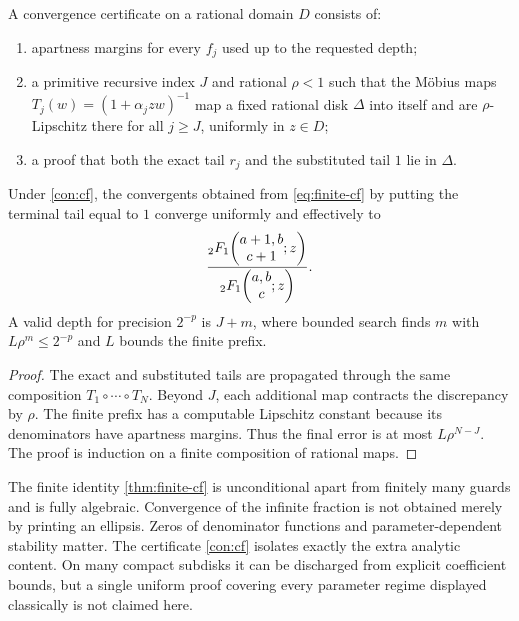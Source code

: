 \begin{contract}\label{con:cf}
A convergence certificate on a rational domain \(D\) consists of:
\begin{enumerate}
\item apartness margins for every \(f_j\) used up to the requested depth;
\item a primitive recursive index \(J\) and rational \(\rho<1\) such that the
Möbius maps \(T_j(w)=(1+\alpha_jzw)^{-1}\) map a fixed rational disk \(\Delta\)
into itself and are \(\rho\)-Lipschitz there for all \(j\ge J\), uniformly in
\(z\in D\);
\item a proof that both the exact tail \(r_j\) and the substituted tail \(1\)
lie in \(\Delta\).
\end{enumerate}
\end{contract}

\begin{theorem}\label{thm:gauss-cf}
Under \cref{con:cf}, the convergents obtained from
\eqref{eq:finite-cf} by putting the terminal tail equal to \(1\) converge
uniformly and effectively to
\[
 \frac{{}_2F_1\!\left(\begin{matrix}a+1,b\\c+1\end{matrix};z\right)}{{}_2F_1\!\left(\begin{matrix}a,b\\c\end{matrix};z\right)}.
\]
A valid depth for precision \(2^{-p}\) is
\(J+m\), where bounded search finds \(m\) with
\(L\rho^m\le2^{-p}\) and \(L\) bounds the finite prefix.
\end{theorem}

\begin{proof}
The exact and substituted tails are propagated through the same composition
\(T_1\circ\cdots\circ T_N\).  Beyond \(J\), each additional map contracts
the discrepancy by \(\rho\).  The finite prefix has a computable Lipschitz
constant because its denominators have apartness margins.  Thus the final
error is at most \(L\rho^{N-J}\).  The proof is induction on a finite
composition of rational maps.
\end{proof}

\begin{audit}
The finite identity \cref{thm:finite-cf} is unconditional apart from finitely
many guards and is fully algebraic.  Convergence of the infinite fraction is
not obtained merely by printing an ellipsis.  Zeros of denominator functions
and parameter-dependent stability matter.  The certificate
\cref{con:cf} isolates exactly the extra analytic content.  On many compact
subdisks it can be discharged from explicit coefficient bounds, but a single
uniform proof covering every parameter regime displayed classically is not
claimed here.
\end{audit}
